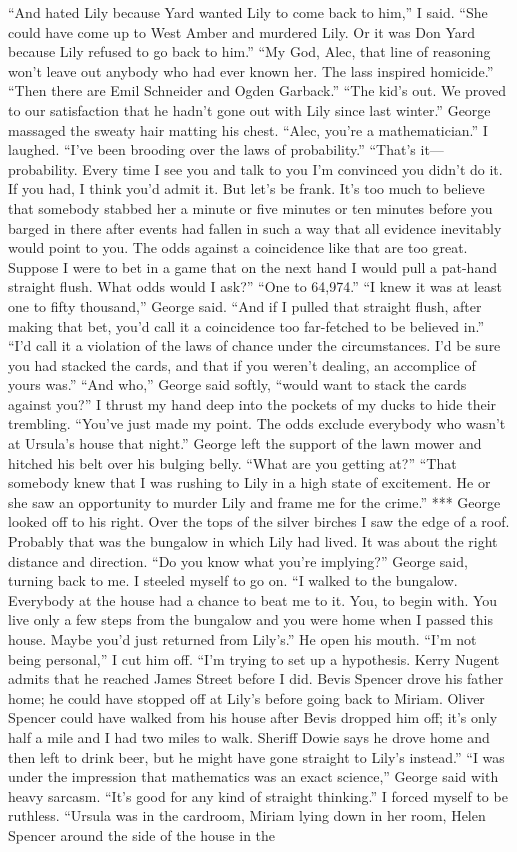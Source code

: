 \documentclass{novel}
\begin{document}
“And hated Lily because Yard wanted Lily to come back to him,” I said. “She could have come up to West Amber and murdered Lily. Or it was Don Yard because Lily refused to go back to him.” “My God, Alec, that line of reasoning won’t leave out anybody who had ever known her. The lass inspired homicide.” “Then there are Emil Schneider and Ogden Garback.” “The kid’s out. We proved to our satisfaction that he hadn’t gone out with Lily since last winter.” George massaged the sweaty hair matting his chest. “Alec, you’re a mathematician.” I laughed. “I’ve been brooding over the laws of probability.” “That’s it—probability. Every time I see you and talk to you I’m convinced you didn’t do it. If you had, I think you’d admit it. But let’s be frank. It’s too much to believe that somebody stabbed her a minute or five minutes or ten minutes before you barged in there after events had fallen in such a way that all evidence inevitably would point to you. The odds against a coincidence like that are too great. Suppose I were to bet in a game that on the next hand I would pull a pat-hand straight flush. What odds would I ask?” “One to 64,974.” “I knew it was at least one to fifty thousand,” George said. “And if I pulled that straight flush, after making that bet, you’d call it a coincidence too far-fetched to be believed in.” “I’d call it a violation of the laws of chance under the circumstances. I’d be sure you had stacked the cards, and that if you weren’t dealing, an accomplice of yours was.” “And who,” George said softly, “would want to stack the cards against you?” I thrust my hand deep into the pockets of my ducks to hide their trembling. “You’ve just made my point. The odds exclude everybody who wasn’t at Ursula’s house that night.” George left the support of the lawn mower and hitched his belt over his bulging belly. “What are you getting at?” “That somebody knew that I was rushing to Lily in a high state of excitement. He or she saw an opportunity to murder Lily and frame me for the crime.” *** George looked off to his right. Over the tops of the silver birches I saw the edge of a roof. Probably that was the bungalow in which Lily had lived. It was about the right distance and direction. “Do you know what you’re implying?” George said, turning back to me. I steeled myself to go on. “I walked to the bungalow. Everybody at the house had a chance to beat me to it. You, to begin with. You live only a few steps from the bungalow and you were home when I passed this house. Maybe you’d just returned from Lily’s.” He open his mouth. “I’m not being personal,” I cut him off. “I’m trying to set up a hypothesis. Kerry Nugent admits that he reached James Street before I did. Bevis Spencer drove his father home; he could have stopped off at Lily’s before going back to Miriam. Oliver Spencer could have walked from his house after Bevis dropped him off; it’s only half a mile and I had two miles to walk. Sheriff Dowie says he drove home and then left to drink beer, but he might have gone straight to Lily’s instead.” “I was under the impression that mathematics was an exact science,” George said with heavy sarcasm. “It’s good for any kind of straight thinking.” I forced myself to be ruthless. “Ursula was in the cardroom, Miriam lying down in her room, Helen Spencer around the side of the house in the 
\end{document}
